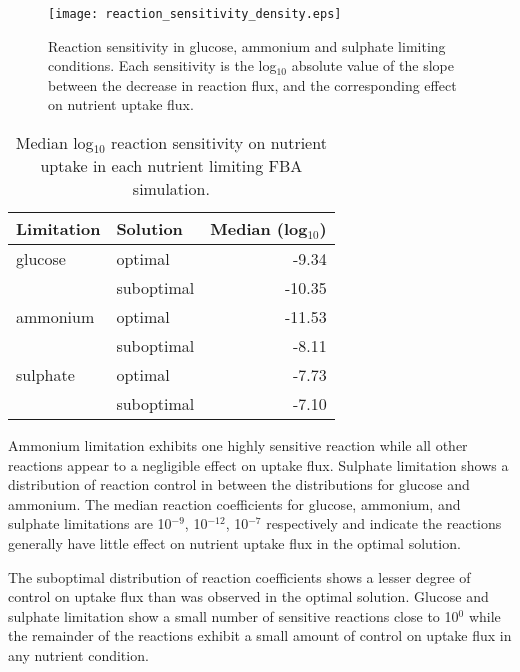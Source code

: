 \begin{figure}%
  \centering
  \texttt{[image: reaction\_sensitivity\_density.eps]}
  \caption[Reaction sensitivity in glucose, ammonium and sulphate limitation]{Reaction sensitivity in glucose, ammonium and sulphate limiting conditions. Each sensitivity is the log$_{10}$ absolute value of the slope between the decrease in reaction flux, and the corresponding effect on nutrient uptake flux. }
  \label{figure:sensitivity_density}
\end{figure}%

\begin{table}%
  \centering
  \begin{tabular}{l l r}
                                                    \toprule
    Limitation  & Solution   & Median (log$_{10}$) \\ \midrule
    glucose     & optimal    &  -9.34            \\
                & suboptimal & -10.35            \\
    ammonium    & optimal    & -11.53            \\
                & suboptimal &  -8.11            \\
    sulphate    & optimal    &  -7.73            \\
                & suboptimal &  -7.10            \\ \bottomrule
  \end{tabular}
  \caption[Median log$_{10}$ reaction sensitivities]{Median log$_{10}$ reaction sensitivity on nutrient uptake in each nutrient limiting FBA simulation. }
  \label{table:median_sensitivity}
\end{table}%

Ammonium limitation exhibits one highly sensitive reaction while all other reactions appear to a negligible effect on uptake flux. Sulphate limitation shows a distribution of reaction control in between the distributions for glucose and ammonium. The median reaction coefficients for glucose, ammonium, and sulphate limitations are 10$^{-9}$, 10$^{-12}$, 10$^{-7}$ respectively and indicate the reactions generally have little effect on nutrient uptake flux in the optimal solution.

The suboptimal distribution of reaction coefficients shows a lesser degree of control on uptake flux than was observed in the optimal solution. Glucose and sulphate limitation show a small number of sensitive reactions close to 10$^0$ while the remainder of the reactions exhibit a small amount of control on uptake flux in any nutrient condition.

